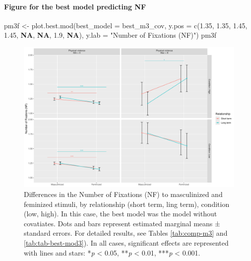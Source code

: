 \documentclass[
  bookmarksnumbered]{article}
\newenvironment{Shaded}{\begin{snugshade}}{\end{snugshade}}
\newcommand{\AttributeTok}[1]{\textcolor[rgb]{0.80,0.80,0.80}{#1}}
\newcommand{\ConstantTok}[1]{\textcolor[rgb]{0.86,0.64,0.64}{\textbf{#1}}}
\newcommand{\FloatTok}[1]{\textcolor[rgb]{0.75,0.75,0.82}{#1}}
\newcommand{\FunctionTok}[1]{\textcolor[rgb]{0.94,0.94,0.56}{#1}}
\newcommand{\NormalTok}[1]{\textcolor[rgb]{0.80,0.80,0.80}{#1}}
\newcommand{\OtherTok}[1]{\textcolor[rgb]{0.94,0.94,0.56}{#1}}
\newcommand{\StringTok}[1]{\textcolor[rgb]{0.80,0.58,0.58}{#1}}
\begin{document}
\paragraph{Figure for the best model predicting NF}\label{figure-for-the-best-model-predicting-nf}

\begin{Shaded}
\begin{Highlighting}[]
\NormalTok{pm3f }\OtherTok{\textless{}{-}} \FunctionTok{plot.best.mod}\NormalTok{(}\AttributeTok{best\_model =}\NormalTok{ best\_m3\_cov, }
                      \AttributeTok{y.pos =} \FunctionTok{c}\NormalTok{(}\FloatTok{1.35}\NormalTok{, }\FloatTok{1.35}\NormalTok{, }\FloatTok{1.45}\NormalTok{, }\FloatTok{1.45}\NormalTok{, }\ConstantTok{NA}\NormalTok{, }\ConstantTok{NA}\NormalTok{, }\FloatTok{1.9}\NormalTok{, }\ConstantTok{NA}\NormalTok{),}
                      \AttributeTok{y.lab =} \StringTok{"Number of Fixations (NF)"}\NormalTok{)}
\NormalTok{pm3f}
\end{Highlighting}
\end{Shaded}

\begin{figure}
\centering
\includegraphics{Supplementary_material_files/figure-latex/fig-mod3-cov-1.pdf}
\caption{\label{fig:fig-mod3-cov}Differences in the Number of Fixations (NF) to masculinized and feminized stimuli, by relationship (short term, ling term), condition (low, high). In this case, the best model was the model without covatiates. Dots and bars represent estimated marginal means ± standard errors. For detailed results, see Tables \ref{tab:comp-m3} and \ref{tab:tab-best-mod3}). In all cases, significant effects are represented with lines and stars: *\emph{p} \textless{} 0.05, **\emph{p} \textless{} 0.01, ***\emph{p} \textless{} 0.001.}
\end{figure}
\end{document}
